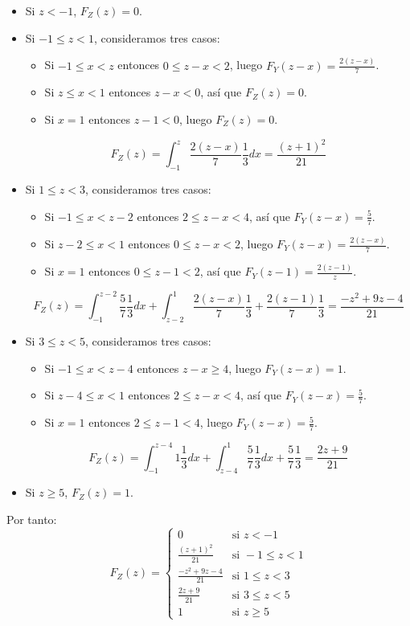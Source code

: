 \begin{exercise}
    \begin{itemize}
        \item Si $z < -1$, $F_Z(z) = 0$.
        \item Si $-1 \leq z < 1$, consideramos tres casos:
              \begin{itemize}
                  \item Si $-1 \leq x < z$ entonces $0 \leq z-x < 2$, luego $F_Y(z-x) = \frac{2(z-x)}{7}$.
                  \item Si $z \leq x < 1$ entonces $z-x < 0$, así que $F_Z(z) = 0$.
                  \item Si $x = 1$ entonces $z-1 < 0$, luego $F_Z(z) = 0$.
              \end{itemize}
              $$F_Z(z) = \int_{-1}^z \frac{2(z-x)}{7}\frac{1}{3}dx = \frac{(z+1)^2}{21}$$
        \item Si $1 \leq z < 3$, consideramos tres casos:
              \begin{itemize}
                  \item Si $-1 \leq x < z-2$ entonces $2 \leq z-x < 4$, así que $F_Y(z-x) = \frac{5}{7}$.
                  \item Si $z-2 \leq x < 1$ entonces $0 \leq z-x < 2$, luego $F_Y(z-x) = \frac{2(z-x)}{7}$.
                  \item Si $x = 1$ entonces $0 \leq z-1 < 2$, así que $F_Y(z-1) = \frac{2(z-1)}{z}$.
              \end{itemize}
              $$F_Z(z) = \int_{-1}^{z-2} \frac{5}{7}\frac{1}{3}dx + \int_{z-2}^1 \frac{2(z-x)}{7}\frac{1}{3} + \frac{2(z-1)}{7}\frac{1}{3} = \frac{-z^2+9z-4}{21}$$
        \item Si $3 \leq z < 5$, consideramos tres casos:
              \begin{itemize}
                  \item Si $-1 \leq x < z-4$ entonces $z-x \geq 4$, luego $F_Y(z-x) = 1$.
                  \item Si $z-4 \leq x < 1$ entonces $2 \leq z-x < 4$, así que $F_Y(z-x) = \frac{5}{7}$.
                  \item Si $x = 1$ entonces $2 \leq z-1 < 4$, luego $F_Y(z-x) = \frac{5}{7}$.
              \end{itemize}
              $$F_Z(z) = \int_{-1}^{z-4} 1 \frac{1}{3}dx + \int_{z-4}^1 \frac{5}{7}\frac{1}{3}dx + \frac{5}{7}\frac{1}{3} = \frac{2z+9}{21}$$
        \item Si $z \geq 5$, $F_Z(z) = 1$.
    \end{itemize}
    Por tanto:
    $$F_Z(z) = \begin{cases}
            0                    & \text{si } z < -1        \\
            \frac{(z+1)^2}{21}   & \text{si } -1 \leq z < 1 \\
            \frac{-z^2+9z-4}{21} & \text{si } 1 \leq z < 3  \\
            \frac{2z+9}{21}      & \text{si } 3 \leq z < 5  \\
            1                    & \text{si } z \geq 5
        \end{cases}$$
\end{exercise}

